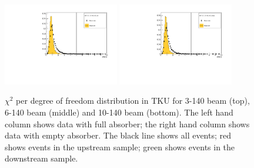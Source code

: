 \begin{figure}[!tbh]
    \includegraphics*[width=0.45\textwidth]{02-Cuts/Figures/2017-2.7_10-140_lH2_full/tku_chi2_us_cut.pdf}
    \includegraphics*[width=0.45\textwidth]{02-Cuts/Figures/2017-2.7_10-140_lH2_empty/tku_chi2_us_cut.pdf}
    \caption{$\chi^2$ per degree of freedom distribution in TKU for 3-140 beam (top), 6-140 beam (middle) and 10-140 beam (bottom).
    The left hand column shows data with full absorber; the right hand column shows data with empty absorber.
    The black line shows all events; red shows events in the upstream sample; green shows events in the downstream sample.
    \label{fig:tku_chi2}}
\end{figure}

